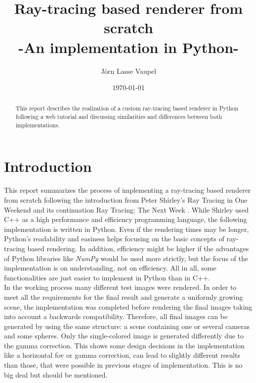 \documentclass[]{article}
\title{Ray-tracing based renderer from scratch\\-An implementation in Python-}
\author{Jörn Lasse Vaupel}
\date{\today}
\begin{document}
	
	\maketitle
	\vfill
	\begin{abstract}
		\noindent
		This report describes the realization of a custom ray-tracing based renderer in Python following a web tutorial and discussing similarities and differences between both implementations.
	\end{abstract}

	\newpage
	\tableofcontents
	\newpage
	
	\section{Introduction}
	\label{sec:intro}
	This report summarizes the process of implementing a ray-tracing based renderer from scratch following the introduction from Peter Shirley’s Ray Tracing in One Weekend  \cite{Shirley2020RTW1} and its continuation Ray Tracing: The Next Week \cite{Shirley2020RTW2}. While Shirley used C++ as a high performance and efficiency programming language, the following implementation is written in Python.  Even if the rendering times may be longer, Python’s readability and easiness helps focusing on the basic concepts of ray-tracing based rendering. In addition, efficiency might be higher if the advantages of Python libraries like \emph{NumPy} would be used more strictly, but the focus of the implementation is on understanding, not on efficiency. All in all, some functionalities are just easier to implement in Python than in C++.
	\\
	In the working process many different test images were rendered. In order to meet all the requirements for the final result and generate a uniformly growing scene, the implementation was completed before rendering the final images taking into account a backwards compatibility. Therefore, all final images can be generated by using the same structure: a scene containing one or several cameras and some spheres. Only the single-colored image is generated differently due to the gamma correction. This shows some design decisions in the implementation like a horizontal \ac{fov} or gamma correction, can lead to slightly different results than those, that were possible in previous stages of implementation. This is no big deal but should be mentioned.
	
\end{document}
